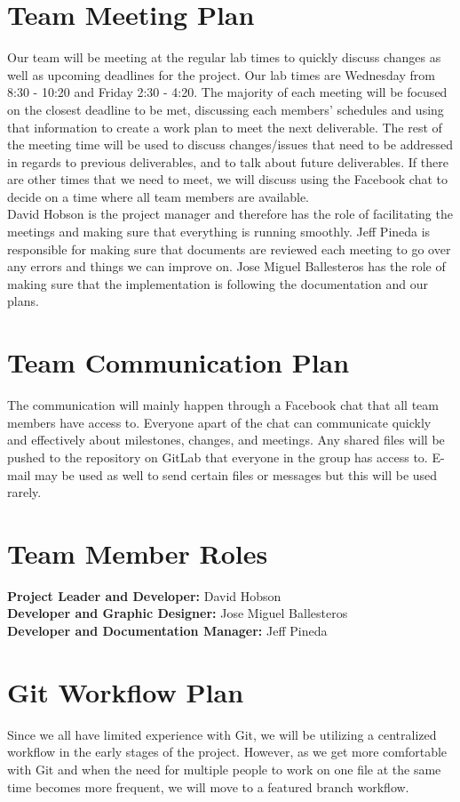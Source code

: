 \documentclass{article}
\begin{document}
\section{Team Meeting Plan}
Our team will be meeting at the regular lab times to quickly discuss changes as well as upcoming deadlines for the project. Our lab times are Wednesday from 8:30 - 10:20 and Friday 2:30 - 4:20. The majority of each meeting will be focused on the closest deadline to be met, discussing each members' schedules and using that information to create a work plan to meet the next deliverable. The rest of the meeting time will be used to discuss changes/issues that need to be addressed in regards to previous deliverables, and to talk about future deliverables. If there are other times that we need to meet, we will discuss using the Facebook chat to decide on a time where all team members are available. 
\\

David Hobson is the project manager and therefore has the role of facilitating the meetings and making sure that everything is running smoothly. Jeff Pineda is responsible for making sure that documents are reviewed each meeting to go over any errors and things we can improve on. Jose Miguel Ballesteros has the role of making sure that the implementation is following the documentation and our plans. 

\section{Team Communication Plan}
The communication will mainly happen through a Facebook chat that all team members have access to. Everyone apart of the chat can communicate quickly and effectively about milestones, changes, and meetings. Any shared files will be pushed to the repository on GitLab that everyone in the group has access to. E-mail may be used as well to send certain files or messages but this will be used rarely. 

\section{Team Member Roles}
\textbf{Project Leader and Developer:}  David Hobson\\
\textbf{Developer and Graphic Designer:}  Jose Miguel Ballesteros\\
\textbf{Developer and Documentation Manager:}  Jeff Pineda\\

\section{Git Workflow Plan}
Since we all have limited experience with Git, we will be utilizing a centralized workflow in the early stages of the project. However, as we get more comfortable with Git and when the need for multiple people to work on one file at the same time becomes more frequent, we will move to a featured branch workflow.
\\
\end{document}
